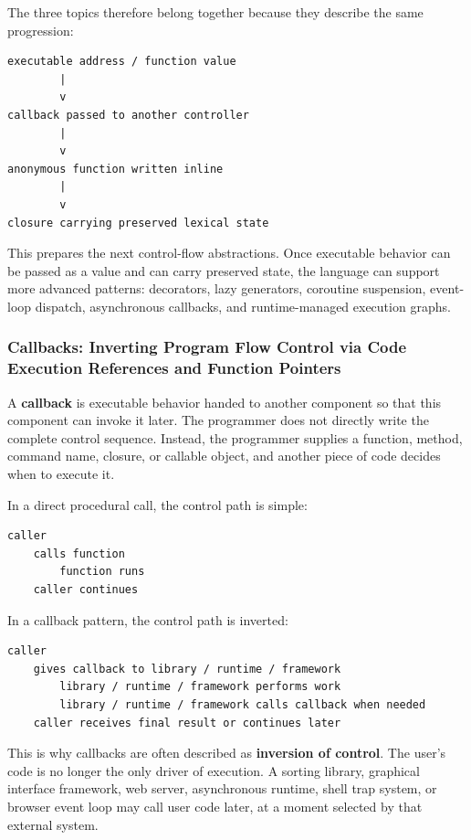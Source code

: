 The three topics therefore belong together because they describe the same progression:

\begin{verbatim}
executable address / function value
        |
        v
callback passed to another controller
        |
        v
anonymous function written inline
        |
        v
closure carrying preserved lexical state
\end{verbatim}

This prepares the next control-flow abstractions. Once executable behavior can be passed as a value and can carry preserved state, the language can support more advanced patterns: decorators, lazy generators, coroutine suspension, event-loop dispatch, asynchronous callbacks, and runtime-managed execution graphs.





\subsubsection{Callbacks: Inverting Program Flow Control via Code Execution References and Function Pointers}

A \textbf{callback} is executable behavior handed to another component so that this component can invoke it later. The programmer does not directly write the complete control sequence. Instead, the programmer supplies a function, method, command name, closure, or callable object, and another piece of code decides when to execute it.

In a direct procedural call, the control path is simple:

\begin{verbatim}
caller
    calls function
        function runs
    caller continues
\end{verbatim}

In a callback pattern, the control path is inverted:

\begin{verbatim}
caller
    gives callback to library / runtime / framework
        library / runtime / framework performs work
        library / runtime / framework calls callback when needed
    caller receives final result or continues later
\end{verbatim}

This is why callbacks are often described as \textbf{inversion of control}. The user's code is no longer the only driver of execution. A sorting library, graphical interface framework, web server, asynchronous runtime, shell trap system, or browser event loop may call user code later, at a moment selected by that external system.

